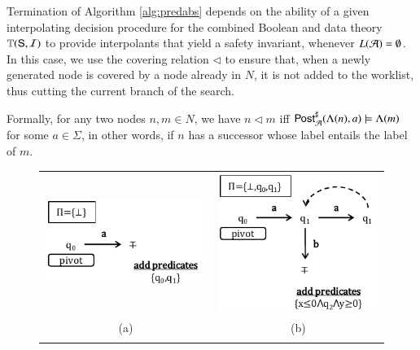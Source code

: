 \documentclass[10pt]{llncs}
\begin{document}
Termination of Algorithm \ref{alg:predabs} depends on the ability of a
given interpolating decision procedure for the combined Boolean and
data theory $\mathbb{T}(\mathsf{S},\mathcal{I})$ to provide interpolants that yield a
safety invariant, whenever $L(\mathcal{A}) = \emptyset$. In this case, we use
the covering relation $\lhd$ to ensure that, when a newly generated
node is covered by a node already in $N$, it is not added to the
worklist, thus cutting the current branch of the search. 

Formally, for any two nodes $n,m \in N$, we have $n \lhd m$ iff
${\mathsf{Post}}^\sharp_{\mathcal{A}}(\Lambda(n),a) \models \Lambda(m)$ for some $a \in
\Sigma$, in other words, if $n$ has a successor whose label entails
the label of $m$.

\begin{figure}[htb]
\begin{center}
\begin{tabular}{cc}
\includegraphics[scale=0.5]{PA1.pdf} & \includegraphics[scale=0.5]{PA2.pdf} \\[-2mm]
\tiny{(a)} & \tiny{(b)} \\
\\

\end{tabular}
\end{center}
\end{figure}
\end{document}

